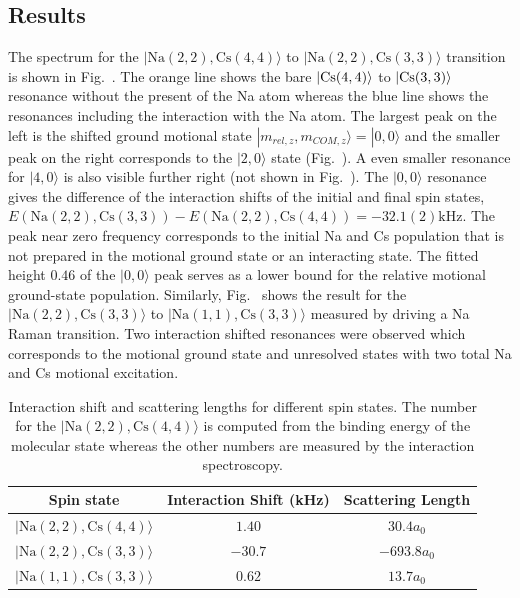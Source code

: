 \subsection{Results}
\label{ch:interaction-shift:result}

The spectrum for the $|\mathrm{Na(2, 2),Cs(4, 4)}\rangle$ to $|\mathrm{Na(2, 2),Cs(3, 3)}\rangle$
transition is shown in Fig.~\todo{}.
The orange line shows the bare $|\mathrm{Cs}(4, 4)\rangle$ to $|\mathrm{Cs}(3, 3)\rangle$ resonance without
the present of the Na atom whereas the blue line shows the resonances
including the interaction with the Na atom.
The largest peak on the left is the shifted ground motional state
$|m_{rel,z},m_{COM,z}\rangle = |0,0\rangle$ and the smaller peak on the right
corresponds to the $|2,0\rangle$ state (Fig.~\todo{}).
A even smaller resonance for $|4,0\rangle$ is also visible further right (not shown in Fig.~\todo{}).
The $|0,0\rangle$ resonance gives the difference of the interaction shifts
of the initial and final spin states,
$E(\mathrm{Na(2, 2),Cs(3, 3)}) - E(\mathrm{Na(2, 2),Cs(4, 4)})=-32.1(2) \mathrm{kHz}$.
The peak near zero frequency corresponds to the initial Na and Cs population that is not prepared
in the motional ground state or an interacting state.
The fitted height $0.46$ of the $|0,0\rangle$ peak serves as a lower bound for
the relative motional ground-state population.
Similarly, Fig.~\todo{} shows the result for
the $|\mathrm{Na(2, 2),Cs(3, 3)}\rangle$ to $|\mathrm{Na(1, 1),Cs(3, 3)}\rangle$
measured by driving a Na Raman transition.
Two interaction shifted resonances were observed which corresponds to
the motional ground state and unresolved states with two total Na and Cs motional excitation.

\begin{table}
  \centering
  \begin{tabular}{|c|c|c|}
    \hline
    Spin state&Interaction Shift (kHz)&Scattering Length\\\hline
    $|\mathrm{Na(2, 2),Cs(4, 4)}\rangle$&$1.40$&$30.4a_0$\\\hline
    $|\mathrm{Na(2, 2),Cs(3, 3)}\rangle$&$-30.7$&$-693.8a_0$\\\hline
    $|\mathrm{Na(1, 1),Cs(3, 3)}\rangle$&$0.62$&$13.7a_0$\\\hline
  \end{tabular}
  \caption[Interaction shift and scattering lengths.]{
    Interaction shift and scattering lengths for different spin states.
    The number for the $|\mathrm{Na(2, 2),Cs(4, 4)}\rangle$ is computed from
    the binding energy of the molecular state whereas the other numbers are
    measured by the interaction spectroscopy.
    \label{table:interaction-shift:results}}
\end{table}

